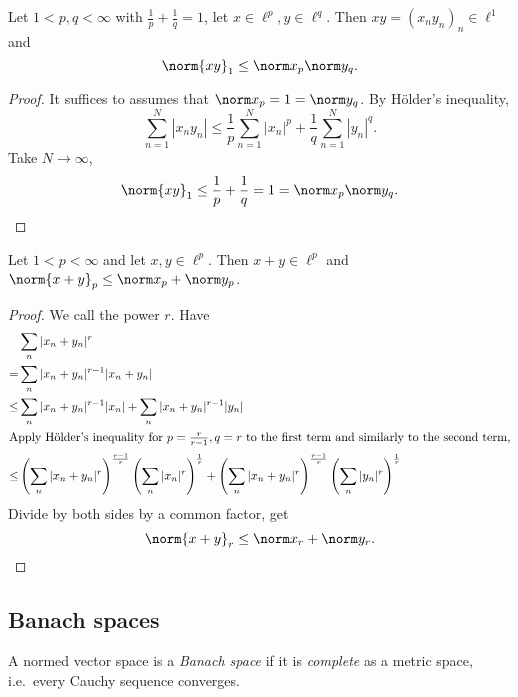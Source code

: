 \documentclass[a4paper]{article}
\begin{document}
\begin{theorem}
  Let \(1 < p, q < \infty\) with \(\frac{1}{p} + \frac{1}{q} = 1\), let \(x \in \ell^p, y \in \ell^q\). Then \(xy = (x_ny_n)_n \in \ell^1\) and
  \[
    \norm{xy}_1 \leq \norm x_p \norm y_q.
  \]
\end{theorem}

\begin{proof}
  It suffices to assumes that \(\norm x_p = 1 = \norm y_q\). By Hölder's inequality,
  \[
    \sum_{n = 1}^N |x_n y_n| \leq \frac{1}{p} \sum_{n = 1}^N |x_n|^p + \frac{1}{q} \sum_{n = 1}^N |y_n|^q.
  \]
  Take \(N \to \infty\),
  \[
    \norm{xy}_1 \leq \frac{1}{p} + \frac{1}{q} = 1 = \norm x_p \norm y_q.
  \]
\end{proof}

\begin{theorem}
  Let \(1 < p < \infty\) and let \(x, y \in \ell^p\). Then \(x + y \in \ell^p\) and \(\norm{x + y}_p \leq \norm x_p + \norm y_p\).
\end{theorem}

\begin{proof}
  We call the power \(r\). Have
  \begin{align*}
    & \sum_n |x_n + y_n|^r \\
    =& \sum_n |x_n + y_n|^{r - 1}|x_n + y_n| \\
    \leq& \sum_n |x_n + y_n|^{r - 1} |x_n| + \sum_n |x_n + y_n|^{r - 1} |y_n| \\
    \intertext{Apply Hölder's inequality for \(p = \frac{r}{r - 1}, q = r\) to the first term and similarly to the second term,}
    \leq& \left( \sum_n |x_n + y_n|^r \right) ^{\frac{r - 1}{r}} \left( \sum_n |x_n|^r \right)^{\frac{1}{r}} + \left( \sum_n |x_n + y_n|^r \right) ^{\frac{r - 1}{r}} \left( \sum_n |y_n|^r \right)^{\frac{1}{r}}
  \end{align*}
  Divide by both sides by a common factor, get
  \[
    \norm{x + y}_r \leq \norm x_r + \norm y_r.
  \]
\end{proof}

\subsection{Banach spaces}

\begin{definition}
  A normed vector space is a \emph{Banach space} if it is \emph{complete} as a metric space, i.e.\ every Cauchy sequence converges.
\end{definition}
\end{document}
